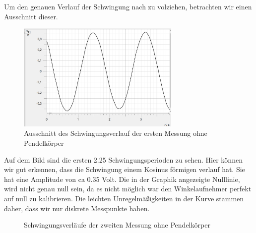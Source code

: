 \documentclass[twoside]{protokoll}
\begin{document}
Um den genauen Verlauf der Schwingung nach zu volziehen, betrachten wir einen Ausschnitt dieser. 
\begin{figure}[H]
    \centering
    \includegraphics[width=0.7\textwidth]{plots/stange-1-mehrere-schwingungeng.pdf}
    \caption{Ausschnitt des Schwingungsverlauf der ersten Messung ohne Pendelkörper}
\end{figure}

Auf dem Bild sind die ersten 2.25 Schwingungsperioden zu sehen.
Hier können wir gut erkennen, dass die Schwingung einem Kosinus förmigen verlauf hat.  
Sie hat eine Amplitude von ca 0.35 Volt. 
Die in der Graphik angezeigte Nulllinie, wird nicht genau null sein, da es nicht möglich war den Winkelaufnehmer perfekt auf null zu kalibrieren.
Die leichten Unregelmäßigkeiten in der Kurve stammen daher, dass wir nur diskrete Messpunkte haben. 

\begin{figure}[H]
    \centering
    \hfill
    \caption{Schwingungsverläufe der zweiten Messung ohne Pendelkörper}
\end{figure}
\end{document}
